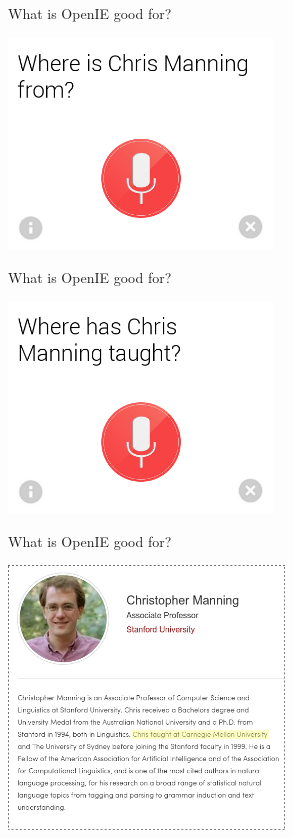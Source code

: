 \def\title{What is OpenIE good for?}
\begin{frame}{\title}
\begin{center}
  \includegraphics[width=7cm]{../img/google-chris-manning-origin.png}
\end{center}
\end{frame}
\begin{frame}{\title}
\begin{center}
  \includegraphics[width=7cm]{../img/google-chris-manning-taught.png}
\end{center}
\end{frame}
\begin{frame}[noframenumbering]{\title}
\begin{center}
  \includegraphics[height=7cm]{../img/chris-coursera-taught.png} \\
\end{center}
\end{frame}

